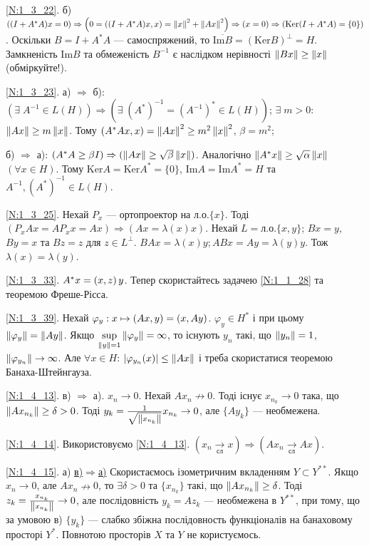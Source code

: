 \noindent\ref{N:1_3_22}. б) $((I + A^* A)x = 0) \Rightarrow \left(0 = \left((I + A^* A)x, x\right)
= \left\lVert x\right\rVert^2 + \left\lVert Ax\right\rVert^2\right) \Rightarrow (x=0) \Rightarrow (\mathrm{Ker}(I + A^* A) = \{0\})$.
Оскільки $B = I + A^* A$ --- самоспряжений, то $\overline{\mathrm{Im}B} =
(\mathrm{Ker}B)^\perp = H$. Замкненість $\mathrm{Im}B$ та обмеженість $B^{-1}$ є наслідком
нерівності $\left\lVert Bx\right\rVert \geq \left\lVert x\right\rVert$ (обміркуйте!). 

\noindent\ref{N:1_3_23}. а) $\Rightarrow$ б): $\left(\exists \;A^{-1} \in L(H)\right) \Rightarrow
\left(\exists\;(A^*)^{-1} = (A^{-1})^* \in L(H)\right)$;
$\exists \;m>0$: $\left\lVert Ax\right\rVert \geq m\left\lVert x\right\rVert$. Тому $\left(A^* A x, x\right) = \left\lVert Ax\right\rVert^2 \geq
m^2 \left\lVert x\right\rVert^2$, $\beta = m^2$;

\noindent б) $\Rightarrow$ а): $(A^* A \geq \beta I) \Rightarrow (\left\lVert Ax\right\rVert \geq 
\sqrt{\beta}\left\lVert x\right\rVert)$. Аналогічно $\left\lVert A^* x\right\rVert \geq \sqrt{\alpha}\left\lVert x\right\rVert$ $(\forall x \in H)$.
Тому $\mathrm{Ker}A = \mathrm{Ker}A^* = \{0\}$, $\mathrm{Im}A = \mathrm{Im}A^* = H$ та
$A^{-1}, (A^*)^{-1} \in L(H)$.

\noindent\ref{N:1_3_25}. Нехай $P_x$ --- ортопроектор на л.о.$\{x\}$. Тоді $(P_x Ax = 
AP_x x = Ax) \Rightarrow (Ax = \lambda(x)x)$. Нехай $L = \text{л.о.}\{x,y\}$;
$Bx = y$, $By = x$ та $Bz = z$ для $z \in L^\perp$. $BAx = \lambda(x)y; ABx = Ay = \lambda(y)y$.
Тож $\lambda(x) = \lambda(y)$.

\noindent\ref{N:1_3_33}. $A^* x = \left(x, z\right)y$. Тепер скористайтесь задачею \ref{N:1_1_28}
та теоремою Фреше-Рісса.

\noindent\ref{N:1_3_39}. Нехай $\varphi_y: x \mapsto \left(Ax, y\right) = \left(x, Ay\right)$.
$\varphi_y \in H^*$ і при цьому $\left\lVert\varphi_y\right\rVert = \left\lVert Ay\right\rVert$. Якщо 
$\underset{\left\lVert y\right\rVert=1}{\sup} \left\lVert\varphi_y\right\rVert = \infty$, то існують $y_n$ такі,
що $\left\lVert y_n\right\rVert = 1$, $\left\lVert\varphi_{y_n}\right\rVert \to \infty$.
Але $\forall x \in H$: $|\varphi_{y_n}(x)| \leq \left\lVert Ax\right\rVert$ і треба скористатися теоремою Банаха-Штейнгауза.

\noindent\ref{N:1_4_13}. в) $\Rightarrow$ а). $x_n \rightarrow 0$. Нехай $A x_n \not\rightarrow 0$. Тоді існує
$x_{n_k} \rightarrow 0$ така, що $\left\lVert A x_{n_k}\right\rVert \geq \delta > 0$. Тоді 
$y_k = \frac{1}{\sqrt{\left\lVert x_{n_k}\right\rVert}} x_{n_k} \rightarrow 0$, але $\{A y_k\}$ --- необмежена.

\noindent\ref{N:1_4_14}. Використовуємо \ref{N:1_4_13}. $(x_n \xrightarrow[\text{сл}]{} x) \Rightarrow (Ax_n \xrightarrow[\text{сл}]{} Ax)$.

\noindent\ref{N:1_4_15}. а) \ul{в)$\Rightarrow$а)} Скористаємось ізометричним вкладенням $Y \subset 
Y^{**}$. Якщо $x_n \rightarrow 0$, але $Ax_n \nrightarrow 0$, то $\exists \delta > 0$ та 
$\{x_{n_k}\}$ такі, що $\left\lVert Ax_{n_k}\right\rVert \geq \delta$. Тоді $z_k = 
\frac{x_{n_k}}{\left\lVert x_{n_k}\right\rVert} \rightarrow 0$, але послідовність $y_k = Az_k$ --- необмежена 
в $Y^{**}$, при тому, що за умовою в) $\{y_k\}$ --- слабко збіжна послідовность функціоналів на 
банаховому просторі $Y^*$. Повнотою просторів $X$ та $Y$ не користуємось.

